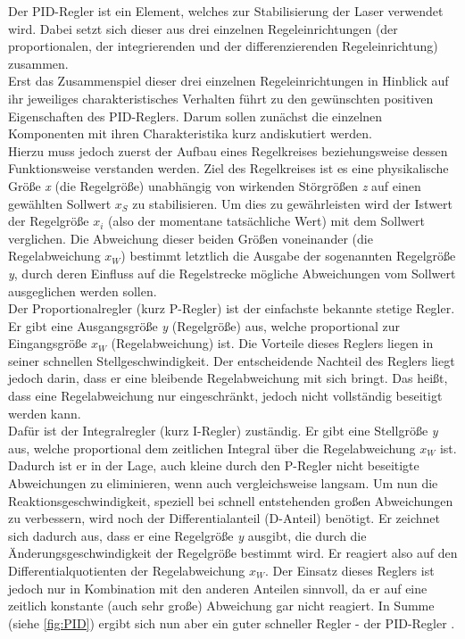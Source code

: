 \documentclass[
class=book,
accentcolor=1b,
custommargins=geometry,
fontsize=11pt,
thesis={type=Versuchsanleitung},
ruledheaders=all,
headline=false,
instbox=false,
marginpar=false,
title=small,
ignore-missing-data=true,
twoside=false,
pdfa=false %
]{apqpub}
\begin{document}
			Der PID-Regler ist ein Element, welches zur Stabilisierung der Laser verwendet wird. Dabei setzt sich dieser aus drei einzelnen Regeleinrichtungen (der proportionalen, der integrierenden und der differenzierenden Regeleinrichtung) zusammen.\\
			Erst das Zusammenspiel dieser drei einzelnen Regeleinrichtungen in Hinblick auf ihr jeweiliges charakteristisches Verhalten führt zu den gewünschten positiven Eigenschaften des PID-Reglers. Darum sollen zunächst die einzelnen Komponenten mit ihren Charakteristika kurz andiskutiert werden.\\
			Hierzu muss jedoch zuerst der Aufbau eines Regelkreises beziehungsweise dessen Funktionsweise verstanden werden. Ziel des Regelkreises ist es eine physikalische Größe \textit{x} (die Regelgröße) unabhängig von wirkenden Störgrößen \textit{z} auf einen gewählten Sollwert $x_S$ zu stabilisieren. Um dies zu gewährleisten wird der Istwert der Regelgröße $x_i$ (also der momentane tatsächliche Wert) mit dem Sollwert verglichen. Die Abweichung dieser beiden Größen voneinander (die Regelabweichung $x_W$) bestimmt letztlich die Ausgabe der sogenannten Regelgröße \textit{y}, durch deren Einfluss auf die Regelstrecke mögliche Abweichungen vom Sollwert ausgeglichen werden sollen.\\ 
			Der Proportionalregler (kurz P-Regler) ist der einfachste bekannte stetige Regler. Er gibt eine Ausgangsgröße \textit{y} (Regelgröße) aus, welche proportional zur Eingangsgröße $x_W$ (Regelabweichung) ist. Die Vorteile dieses Reglers liegen in seiner schnellen Stellgeschwindigkeit. Der entscheidende Nachteil des Reglers liegt jedoch darin, dass er eine bleibende Regelabweichung mit sich bringt. Das heißt, dass eine Regelabweichung nur eingeschränkt, jedoch nicht vollständig beseitigt werden kann.\\
			Dafür ist der Integralregler (kurz I-Regler) zuständig. Er gibt eine Stellgröße \textit{y} aus, welche proportional dem zeitlichen Integral über die Regelabweichung $x_W$ ist. Dadurch ist er in der Lage, auch kleine durch den P-Regler nicht beseitigte Abweichungen zu eliminieren, wenn auch vergleichsweise langsam.
			Um nun die Reaktionsgeschwindigkeit, speziell bei schnell entstehenden großen Abweichungen zu verbessern, wird noch der Differentialanteil (D-Anteil) benötigt. Er zeichnet sich dadurch aus, dass er eine Regelgröße \textit{y} ausgibt, die durch die Änderungsgeschwindigkeit der Regelgröße bestimmt wird. Er reagiert also auf den Differentialquotienten der Regelabweichung $x_W$. Der Einsatz dieses Reglers ist jedoch nur in Kombination mit den anderen Anteilen sinnvoll, da er auf eine zeitlich konstante (auch sehr große) Abweichung gar nicht reagiert. In Summe (siehe \autoref{fig:PID}) ergibt sich nun aber ein guter schneller Regler - der PID-Regler \cite{PID}.\\ 
			
\end{document}
